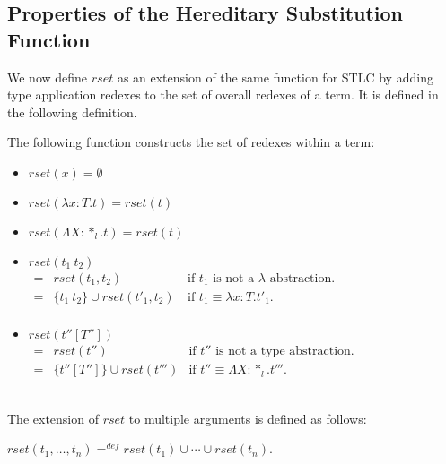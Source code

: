\subsection{Properties of the Hereditary Substitution Function}
\label{sec:properties_of_the_hereditary_substitution_function_ssf}
We now define $rset$ as an extension of the same function for STLC by
adding type application redexes to the set of overall redexes
of a term.  It is defined in the following definition.  
\begin{definition}
  \label{def:rset_ssf}
  The following function constructs the set of redexes within a term:
  \begin{center}
    \begin{itemize}
    \item[] $rset(x) = \emptyset$\\
    \item[] $rset(\lambda x:T.t) = rset(t)$\\
    \item[] $rset(\Lambda X:*_l.t) = rset(t)$\\
    \item[] $rset(t_1\ t_2)$\\
      \begin{math}
        \begin{array}{lll}
          = & rset(t_1, t_2) & \text{if } t_1 \text{ is not a } \lambda \text{-abstraction.}\\
          = & \{t_1\ t_2\} \cup rset(t'_1, t_2)\ & \text{if } t_1 \equiv \lambda x:T.t'_1.\\
        \end{array}
      \end{math}
    \item[] $rset(t''[T''])$\\
      \begin{math}
        \begin{array}{lll}
          = & rset(t'') & \text{if } t'' \text{ is not a type abstraction.}\\
          = & \{t''[T'']\} \cup rset(t''') & \text{if } t'' \equiv \Lambda X:*_l.t'''.
        \end{array}
      \end{math}
    \end{itemize}
  \end{center}
  \ \\
  The extension of $rset$ to multiple arguments is defined as follows:
  \begin{center}
    $rset(t_1, \ldots, t_n) =^{def} rset(t_1) \cup \cdots \cup rset(t_n)$.
  \end{center}
\end{definition}
